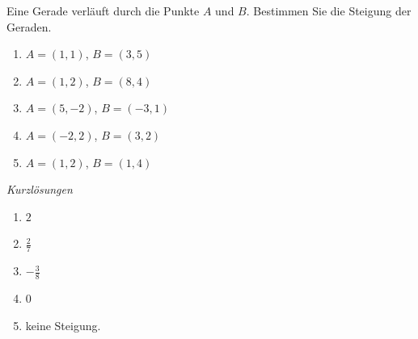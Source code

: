 \begin{ueb}
    {}{}
    Eine Gerade verläuft durch die Punkte \(A\) und \(B\). Bestimmen Sie die Steigung der Geraden.
    \begin{enumerate}
        \item \(A=(1, 1)\), \(B=(3, 5)\)
        \item \(A=(1, 2)\), \(B=(8, 4)\)
        \item \(A=(5, -2)\), \(B=(-3, 1)\)
        \item \(A=(-2, 2)\), \(B=(3, 2)\)
        \item \(A=(1, 2)\), \(B=(1, 4)\)
    \end{enumerate}
\end{ueb}
\clearpage
\emph{Kurzlösungen}
\begin{enumerate}
    \item \(2\)
    \item \(\frac{2}{7}\)
    \item \(-\frac{3}{8}\)
    \item \(0\)
    \item keine Steigung.
\end{enumerate}
















\clearpage
